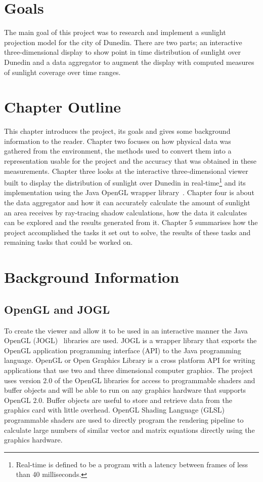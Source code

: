 \documentclass[12pt]{report}
\begin{document}
\section{Goals}
The main goal of this project was to research and implement a sunlight projection model for the city of Dunedin. There are two parts; an interactive three-dimensional display to show point in time distribution of sunlight over Dunedin and a data aggregator to augment the display with computed measures of sunlight coverage over time ranges.

\section{Chapter Outline}
This chapter introduces the project, its goals and gives some background information to the reader. Chapter two focuses on how physical data was gathered from the environment, the methods used to convert them into a representation usable for the project and the accuracy that was obtained in these measurements. Chapter three looks at the interactive three-dimensional viewer built to display the distribution of sunlight over Dunedin in real-time\footnote{Real-time is defined to be a program with a latency between frames of less than 40 milliseconds.} and its implementation using the Java OpenGL wrapper library~\cite{JOGL}. Chapter four is about the data aggregator and how it can accurately calculate the amount of sunlight an area receives by ray-tracing shadow calculations, how the data it calculates can be explored and the results generated from it. Chapter 5 summarises how the project accomplished the tasks it set out to solve, the results of these tasks and remaining tasks that could be worked on.

\section{Background Information}
\subsection{OpenGL and JOGL} 
To create the viewer and allow it to be used in an interactive manner the Java OpenGL (JOGL)~\cite{JOGL} libraries are used. JOGL is a wrapper library that exports the OpenGL application programming interface (API) to the Java programming language. OpenGL or Open Graphics Library is a cross platform API for writing applications that use two and three dimensional computer graphics. The project uses version 2.0 of the OpenGL libraries for access to programmable shaders and buffer objects and will be able to run on any graphics hardware that supports OpenGL 2.0. Buffer objects are useful to store and retrieve data from the graphics card with little overhead.
OpenGL Shading Language (GLSL) programmable shaders are used to directly program the rendering pipeline to calculate large numbers of similar vector and matrix equations directly using the graphics hardware.
\end{document}
